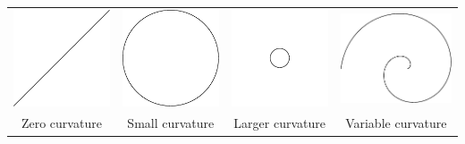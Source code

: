 \begin{center}
	\begin{tabular}{c@{\qquad}c@{\qquad}c@{\qquad}c}
		\includegraphics[scale=0.8]{intro-curve} & \includegraphics[scale=0.8]{intro-curve3} & \includegraphics[scale=0.8]{intro-curve2}
		& \includegraphics[scale=0.8]{intro-curve4} \\[5pt]
		Zero curvature & Small curvature & Larger curvature
		& Variable curvature
	\end{tabular}
\end{center}

